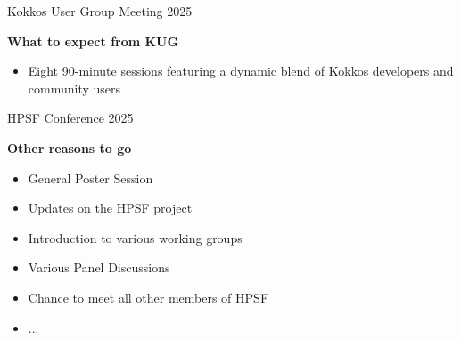\begin{frame}[fragile]{Kokkos User Group Meeting 2025}
\begin{center}
\textbf{What to expect from KUG}
\end{center}

\begin{itemize}
  \item{Eight 90-minute sessions featuring a dynamic blend of Kokkos developers and community users}

\end{itemize}
\end{frame}

\begin{frame}[fragile]{HPSF Conference 2025}
\begin{center}
\textbf{Other reasons to go}
\end{center}

\begin{itemize}
  \item{General Poster Session}
  \item{Updates on the HPSF project}
  \item{Introduction to various working groups}
  \item{Various Panel Discussions}
  \item{Chance to meet all other members of HPSF}
  \item{...}
\end{itemize}
\end{frame}

